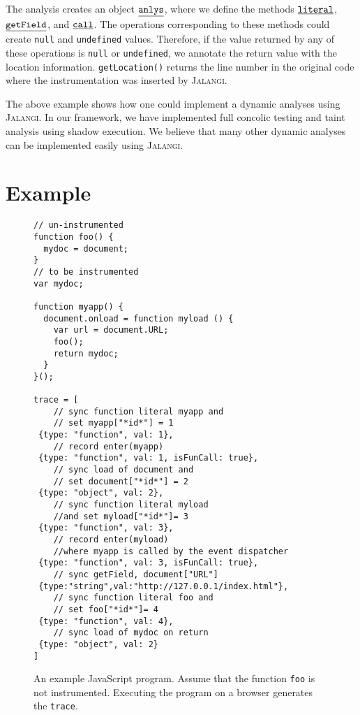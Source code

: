 \documentclass{sig-alternate}
\def\jalangi{\textsc{Jalangi}}
\newcommand \usl [1] {\mbox{\underline{\tt #1}}\xspace}
\newcommand \analysis{\usl{anlys}}
\begin{document}
The analysis creates an object $\analysis$, where we define the
methods $\usl{literal}$, $\usl{getField}$, and $\usl{call}$.  The
operations corresponding to these methods could create \texttt{null}
and \texttt{undefined} values.  Therefore, if the value returned by
any of these operations is \texttt{null} or \texttt{undefined}, we
annotate the return value with the location information.
\texttt{getLocation()} returns the line number in the original code
where the instrumentation was inserted by \jalangi{}.

The above example shows how one could implement a dynamic analyses
using \jalangi{}.  In our framework, we have implemented full concolic
testing and taint analysis using shadow execution.  We believe that
many other dynamic analyses can be implemented easily using
\jalangi{}.

\section{Example}
\label{sec:example}

\begin{figure}
 {\scriptsize
\begin{lstlisting}[mathescape]
// un-instrumented
function foo() {
  mydoc = document;
}
// to be instrumented
var mydoc;

function myapp() {
  document.onload = function myload () {
    var url = document.URL;
    foo();
    return mydoc;
  }
}();

trace = [
    // sync function literal myapp and 
    // set myapp["*id*"] = 1  
 {type: "function", val: 1},
    // record enter(myapp)
 {type: "function", val: 1, isFunCall: true}, 
    // sync load of document and 
    // set document["*id*"] = 2
 {type: "object", val: 2}, 
    // sync function literal myload 
    //and set myload["*id*"]= 3 
 {type: "function", val: 3}, 
    // record enter(myload) 
    //where myapp is called by the event dispatcher  
 {type: "function", val: 3, isFunCall: true}, 
    // sync getField, document["URL"]
 {type:"string",val:"http://127.0.0.1/index.html"}, 
    // sync function literal foo and 
    // set foo["*id*"]= 4
 {type: "function", val: 4}, 
    // sync load of mydoc on return
 {type: "object", val: 2} 
]
\end{lstlisting}
}
  \caption{An example JavaScript program.  Assume that the function
    \texttt{foo} is not instrumented.  Executing the program on a
    browser generates the \texttt{trace}.  }
  \label{fig:example}
\end{figure}
\end{document}
